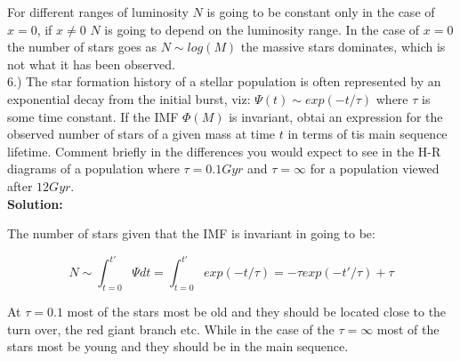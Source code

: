 \documentclass[14pt]{article}
\begin{document}
For different ranges of luminosity $N$ is going to be constant only in
the case of $x=0$, if $x \neq 0$ $N$ is going to depend on the
luminosity range. In the case of $x=0$ the number of stars goes as
$N\sim log(M)$ the massive stars dominates, which is not what it has
been observed.\\

6.) The star formation history of a stellar population is often
represented by an exponential decay from the initial burst, viz:
$\Psi(t)\sim exp(-t/\tau)$ where $\tau$ is some time constant. If the
IMF $\Phi(M)$ is invariant, obtai an expression for the observed number
of stars of a given mass at time $t$ in terms of tis main sequence
lifetime. Comment briefly in the differences you would expect to see
in the H-R diagrams of a population where $\tau=0.1 Gyr$ and
$\tau=\infty$ for a population viewed after $12Gyr$.\\

\textbf{Solution:}

The number of stars given that the IMF is invariant in going to be:

\begin{equation}
N \sim \int_{t=0}^{t'} \Psi dt = \int_{t=0}^{t'} exp(-t/\tau) = -\tau
exp(-t'/\tau) + \tau
\end{equation}

At $\tau=0.1$ most of the stars most be old and they should be located close to
the turn over, the red giant branch etc. While in the case of the $\tau=\infty$ most of the
stars most be young and they should be in the main sequence.
\end{document}
